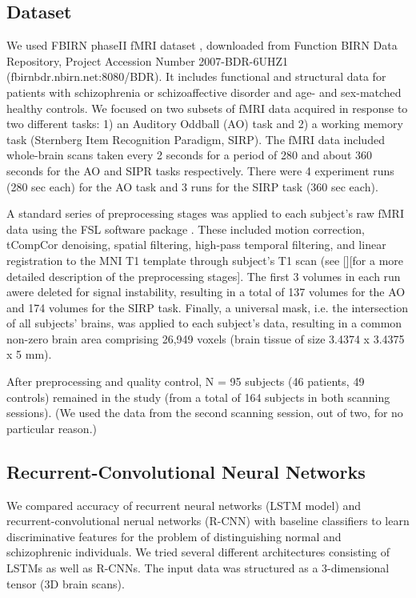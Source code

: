 \documentclass{article} %
\begin{document}
\subsection{Dataset}
We used FBIRN phaseII fMRI dataset \citep{Keator2016}, downloaded from Function BIRN Data Repository, Project Accession Number 2007-BDR-6UHZ1 (fbirnbdr.nbirn.net:8080/BDR). It includes functional and structural data for patients with schizophrenia or schizoaffective disorder and age- and sex-matched healthy controls. We focused on two subsets of fMRI data acquired in response to two different tasks: 1) an Auditory Oddball (AO) task and 2) a working memory task (Sternberg Item Recognition Paradigm, SIRP). The fMRI data included whole-brain scans taken every 2 seconds for a period of 280 and about 360 seconds for the AO and SIPR tasks respectively. There were 4 experiment runs (280 sec each) for the AO task and 3 runs for the SIRP task (360 sec each).

A standard series of preprocessing stages was applied to each subject’s raw fMRI data using the FSL software package \citep{Jenkinson2012}. These included motion correction, tCompCor denoising, spatial filtering, high-pass temporal filtering, and linear registration to the MNI T1 template through subject’s T1 scan (see \citep[see]{Gheiratmand2017}[][for a more detailed description of the preprocessing stages]. The first 3 volumes in each run awere deleted for signal instability, resulting in a total of 137 volumes for the AO and 174 volumes for the SIRP task. Finally, a universal mask, i.e. the intersection of all subjects’ brains, was applied to each subject’s data, resulting in a common non-zero brain area comprising 26,949 voxels (brain tissue of size 3.4374 x 3.4375 x 5 mm).

After preprocessing and quality control, N = 95 subjects (46 patients, 49 controls) remained in the study (from a total of 164 subjects in both scanning sessions). (We used the data from the second scanning session, out of two, for no particular reason.)

\subsection{Recurrent-Convolutional Neural Networks}
We compared accuracy of recurrent neural networks (LSTM model) and recurrent-convolutional nerual networks (R-CNN) with baseline classifiers to learn discriminative features for the problem of distinguishing normal and schizophrenic individuals. We tried several different architectures consisting of LSTMs as well as R-CNNs. The input data was structured as a 3-dimensional tensor (3D brain scans). 
\end{document}

